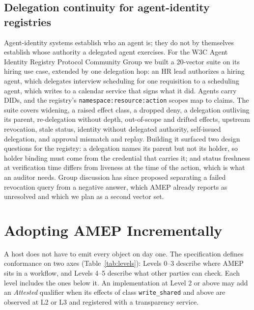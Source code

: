 \documentclass[conference]{IEEEtran}
\newcommand{\unres}{\textsf{unresolved}}
\newcommand{\code}[1]{\texttt{\small #1}}
\begin{document}
\subsection{Delegation continuity for agent-identity registries}
Agent-identity systems establish who an agent is; they do not by themselves establish whose authority a delegated agent exercises. For the W3C Agent Identity Registry Protocol Community Group we built a 20-vector suite on its hiring use case, extended by one delegation hop: an HR lead authorizes a hiring agent, which delegates interview scheduling for one requisition to a scheduling agent, which writes to a calendar service that signs what it did. Agents carry DIDs, and the registry's \code{namespace:resource:action} scopes map to claims. The suite covers widening, a raised effect class, a dropped deny, a delegation outliving its parent, re-delegation without depth, out-of-scope and drifted effects, upstream revocation, stale status, identity without delegated authority, self-issued delegation, and approval mismatch and replay. Building it surfaced two design questions for the registry: a delegation names its parent but not its holder, so holder binding must come from the credential that carries it; and status freshness at verification time differs from liveness at the time of the action, which is what an auditor needs. Group discussion has since proposed separating a failed revocation query from a negative answer, which AMEP already reports as \unres{} and which we plan as a second vector set.

\section{Adopting AMEP Incrementally}

A host does not have to emit every object on day one. The specification defines conformance on two axes (Table~\ref{tab:levels}): Levels 0--3 describe where AMEP sits in a workflow, and Levels 4--5 describe what other parties can check. Each level includes the ones below it. An implementation at Level 2 or above may add an \emph{Attested} qualifier when its effects of class \code{write\_shared} and above are observed at L2 or L3 and registered with a transparency service.
\end{document}
